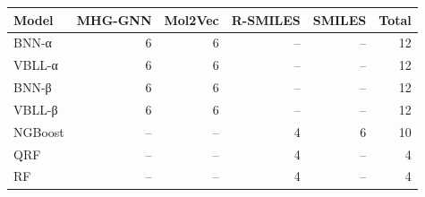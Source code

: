 \begin{tabular}{lrrrrr}
\toprule
\textbf{Model} & \textbf{MHG-GNN} & \textbf{Mol2Vec} & \textbf{R-SMILES} & \textbf{SMILES} & \textbf{Total} \\
\midrule
BNN-α & 6 & 6 & -- & -- & 12 \\
VBLL-α & 6 & 6 & -- & -- & 12 \\
BNN-β & 6 & 6 & -- & -- & 12 \\
VBLL-β & 6 & 6 & -- & -- & 12 \\
NGBoost & -- & -- & 4 & 6 & 10 \\
QRF & -- & -- & 4 & -- & 4 \\
RF & -- & -- & 4 & -- & 4 \\
\bottomrule
\end{tabular}